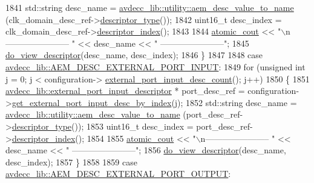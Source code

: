 \begin{DoxyCode}
1841             std::string desc\_name = \hyperlink{namespaceavdecc__lib_1_1utility_a6bdd02679e5a911a071d4aa03be341f0}{avdecc\_lib::utility::aem\_desc\_value\_to\_name}
      (clk\_domain\_desc\_ref->\hyperlink{classavdecc__lib_1_1descriptor__base_a5112b70022171063ec5d3242bee9910e}{descriptor\_type}());
1842             uint16\_t desc\_index = clk\_domain\_desc\_ref->\hyperlink{classavdecc__lib_1_1descriptor__base_a7eed5583bffdf72d89021b188648c1b5}{descriptor\_index}();
1843 
1844             \hyperlink{cmd__line_8h_a0bc38ccc65c79ba06c6fcd7b4bf554c3}{atomic\_cout} << \textcolor{stringliteral}{"\(\backslash\)n----------------------- "} << desc\_name << \textcolor{stringliteral}{"
       -----------------------"};
1845             \hyperlink{classcmd__line_aef7d9f8c4eff85c46e5b7aea0961bb51}{do\_view\_descriptor}(desc\_name, desc\_index);
1846         \}
1847 
1848     \textcolor{keywordflow}{case} \hyperlink{namespaceavdecc__lib_ac7b7d227e46bc72b63ee9e9aae15902fafd26fe044fb2548e13163acbfad1812c}{avdecc\_lib::AEM\_DESC\_EXTERNAL\_PORT\_INPUT}:
1849         \textcolor{keywordflow}{for} (\textcolor{keywordtype}{unsigned} \textcolor{keywordtype}{int} j = 0; j < configuration->
      \hyperlink{classavdecc__lib_1_1configuration__descriptor_a88158805661b69b56051916e25de58cc}{external\_port\_input\_desc\_count}(); j++)
1850         \{
1851             \hyperlink{classavdecc__lib_1_1external__port__input__descriptor}{avdecc\_lib::external\_port\_input\_descriptor} * 
      port\_desc\_ref = configuration->\hyperlink{classavdecc__lib_1_1configuration__descriptor_a0ce53511b68efa1e6e992431faac667e}{get\_external\_port\_input\_desc\_by\_index}(j);
1852             std::string desc\_name = \hyperlink{namespaceavdecc__lib_1_1utility_a6bdd02679e5a911a071d4aa03be341f0}{avdecc\_lib::utility::aem\_desc\_value\_to\_name}
      (port\_desc\_ref->\hyperlink{classavdecc__lib_1_1descriptor__base_a5112b70022171063ec5d3242bee9910e}{descriptor\_type}());
1853             uint16\_t desc\_index = port\_desc\_ref->\hyperlink{classavdecc__lib_1_1descriptor__base_a7eed5583bffdf72d89021b188648c1b5}{descriptor\_index}();
1854 
1855             \hyperlink{cmd__line_8h_a0bc38ccc65c79ba06c6fcd7b4bf554c3}{atomic\_cout} << \textcolor{stringliteral}{"\(\backslash\)n----------------------- "} << desc\_name << \textcolor{stringliteral}{"
       -----------------------"};
1856             \hyperlink{classcmd__line_aef7d9f8c4eff85c46e5b7aea0961bb51}{do\_view\_descriptor}(desc\_name, desc\_index);
1857         \}
1858 
1859     \textcolor{keywordflow}{case} \hyperlink{namespaceavdecc__lib_ac7b7d227e46bc72b63ee9e9aae15902fa60159ed7fb6c5bf542208f134c202c67}{avdecc\_lib::AEM\_DESC\_EXTERNAL\_PORT\_OUTPUT}:

\end{DoxyCode}
